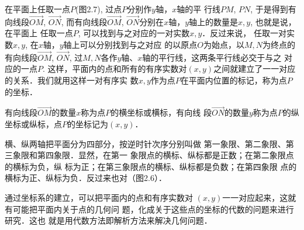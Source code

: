 \begin{figure}[htp]
\centering
\begin{minipage}[t]{0.48\textwidth}
\centering
{}
\caption{}
\end{minipage}
\begin{minipage}[t]{0.48\textwidth}
\centering
{}
\caption{}
\end{minipage}
\end{figure}



在平面上任取一点$P$(图2.7), 过点$P$分别作$y$轴，$x$轴的平
行线$PM$, $PN$, 于是得到有向线段$\Vec{OM}$, $\Vec{ON}$, 而有向线段$\Vec{OM}$, $\Vec{ON}$分别在$x$轴，$y$轴上的数量是$x,y$, 也就是说，在平面上
任取一点$P$, 可以找到与之对应的一对实数$x,y$．反过来说，
任取一对实数$x,y$, 在$x$轴，$y$轴上可以分别找到与之对应
的以原点$O$为始点，以$M,N$为终点的有向线段$\Vec{OM}$, $\Vec{ON}$,
过$M,N$各作$y$轴、$x$轴的平行线，这两条平行线必交于与之
对应的一点$P$. 这样，平面内的点和所有的有序实数对$(x,y)$之间就建立了一一对应的关系．我们就用这样一对有序实
数$x,y$作为点$P$在平面内位置的标记，称为点$P$的坐标．

有向线段$\Vec{OM}$的数量$x$称为点$P$的横坐标或横标，有向线
段$\Vec{ON}$的数量$y$称为点$P$的纵坐标或纵标，点$P$的坐标记为$(x,
y)$．

横、纵两轴把平面分为四部分，按逆时针次序分别叫做
第一象限、第二象限、第三象限和第四象限．显然，在第一
象限点的横标、纵标都是正数；在第二象限点的横标为负，纵
标为正；在第三象限点的横标、纵标都是负数；在第四象限
点的横标为正、纵标为负．反过来也对（图2.6）．

通过坐标系的建立，可以把平面内的点和有序实数对
$(x,y)$一一对应起来，这就有可能把平面内关于点的几何问
题，化成关于这些点的坐标的代数的问题来进行研究．这也
就是用代数方法即解析方法来解决几何问题．

